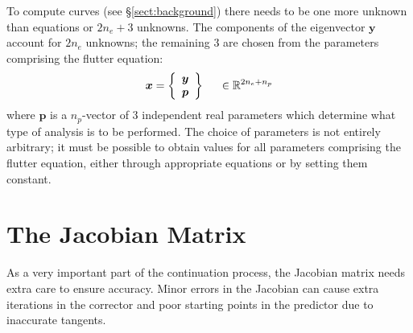 \documentclass[10pt,openany,twoside]{book}
\numberwithin{equation}{section}   %
\newcommand{\Vector}[1]{\boldsymbol{#1}}
\newcommand{\Sectref}[1]{\S\ref{#1}}
\begin{document}
To compute curves (see \Sectref{sect:background})
there needs to be one more unknown than equations or $2n_e+3$ unknowns.
The components of the eigenvector $\Vector{y}$ account for $2n_e$ unknowns;
the remaining 3 are chosen from the parameters comprising the flutter equation:
\begin{equation}
	\Vector{x} = \left\{\begin{array}{c}
		\Vector{y} \\
		\Vector{p} \\
	\end{array} \right\} \hspace{0.2in} \in \mathbb{R}^{2n_e+n_p}
\end{equation}
where $\Vector{p}$ is a $n_p$-vector of 3 independent
real parameters which determine what type of analysis is to be performed.
The choice of parameters is not entirely arbitrary; it must be possible to
obtain values for all parameters comprising the flutter equation,
either through appropriate equations or by setting them constant.

\section{The Jacobian Matrix}
As a very important part of the continuation process, the Jacobian
matrix needs extra care to ensure accuracy. Minor errors in the
Jacobian can cause extra iterations in the corrector and poor starting
points in the predictor due to inaccurate tangents.
\end{document}
